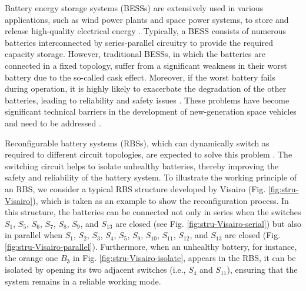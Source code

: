 \documentclass{article}
\begin{document}
Battery energy storage systems (BESSs) are extensively used in various applications, such as wind power plants and space power systems, to store and release high-quality electrical energy \cite{desiqueiraControlStrategySmooth2021,yangBatteryEnergyStorage2018,choCommercialResearchBattery2015,zhangDevelopmentProspectChinese2021,schwanbeckInternationalSpaceStation2019}.
Typically, a BESS consists of numerous batteries interconnected by series-parallel circuitry to provide the required capacity storage.
However, traditional BESSs, in which the batteries are connected in a fixed topology, suffer from a significant weakness in their worst battery due to the so-called cask effect.
Moreover, if the worst battery fails during operation, it is highly likely to exacerbate the degradation of the other batteries, leading to reliability and safety issues \cite{yangUnbalancedDischargingAging2016,fengPropagationMechanismsDiagnosis2019,jeevarajanBatterySafetyQualifications2012}.
These problems have become significant technical barriers in the development of new-generation space vehicles and need to be addressed \cite{pomboHybridPowerSystem2021}.


Reconfigurable battery systems (RBSs), which can dynamically switch as required to different circuit topologies, are expected to solve this problem \cite{hanNextGenerationBatteryManagement2020a}.
The switching circuit helps to isolate unhealthy batteries, thereby improving the safety and reliability of the battery system.
To illustrate the working principle of an RBS, we consider a typical RBS structure developed by Visairo \cite{visairoReconfigurableBatteryPack2008} (Fig. \ref{fig:stru-Visairo}), which is taken as an example to show the reconfiguration process.
In this structure, the batteries can be connected not only in series when the switches $S_1$, $S_5$, $S_6$, $S_7$, $S_8$, $S_9$, and $S_{13}$ are closed (see Fig. \ref{fig:stru-Visairo-serial}) but also in parallel when $S_1$, $S_2$, $S_3$, $S_4$, $S_5$, $S_9$, $S_{10}$, $S_{11}$, $S_{12}$, and $S_{13}$ are closed (Fig. \ref{fig:stru-Visairo-parallel}).
Furthermore, when an unhealthy battery, for instance, the orange one $B_3$ in Fig. \ref{fig:stru-Visairo-isolate}, appears in the RBS, it can be isolated by opening its two adjacent switches (i.e., $S_4$ and $S_{11}$), ensuring that the system remains in a reliable working mode.
\end{document}
